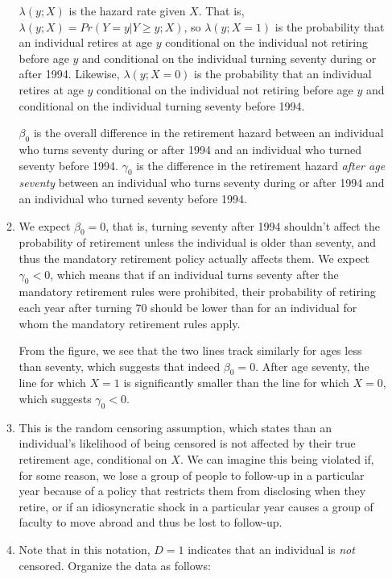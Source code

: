 \documentclass{article}
\begin{document}
\begin{enumerate}
\begin{enumerate}
		$\lambda(y;X)$ is the hazard rate given $X$. That is, $\lambda(y;X) = Pr(Y=y| Y \geq y; X)$, so  $\lambda(y;X=1)$ is the probability that an individual retires at age $y$ conditional on the individual not retiring before age $y$ and conditional on the individual turning seventy during or after 1994. Likewise, $\lambda(y;X=0)$ is the probability that an individual retires at age $y$ conditional on the individual not retiring before age $y$ and conditional on the individual turning seventy before 1994.

		$\beta_0$ is the overall difference in the retirement hazard between an individual who turns seventy during or after 1994 and an individual who turned seventy before 1994. $\gamma_0$ is the difference in the retirement hazard \textit{after age seventy} between an individual who turns seventy during or after 1994 and an individual who turned seventy before 1994. 

		\item

		We expect $\beta_0 = 0$, that is, turning seventy after 1994 shouldn't affect the probability of retirement unless the individual is older than seventy, and thus the mandatory retirement policy actually affects them. We expect $\gamma_0 < 0$, which means that if an individual turns seventy after the mandatory retirement rules were prohibited, their probability of retiring each year after turning 70 should be lower than for an individual for whom the mandatory retirement rules apply.

		From the figure, we see that the two lines track similarly for ages less than seventy, which suggests that indeed $\beta_0 = 0$. After age seventy, the line for which $X = 1$ is significantly smaller than the line for which $X = 0$, which suggests $\gamma_0 < 0$.

		\item

		This is the random censoring assumption, which states than an individual's likelihood of being censored is not affected by their true retirement age, conditional on $X$. We can imagine this being violated if, for some reason, we lose a group of people to follow-up in a particular year because of a policy that restricts them from disclosing when they retire, or if an idiosyncratic shock in a particular year causes a group of faculty to move abroad and thus be lost to follow-up.

		\item

		Note that in this notation, $D = 1$ indicates that an individual is \textit{not} censored. Organize the data as follows:


\end{enumerate}
\end{enumerate}
\end{document}

